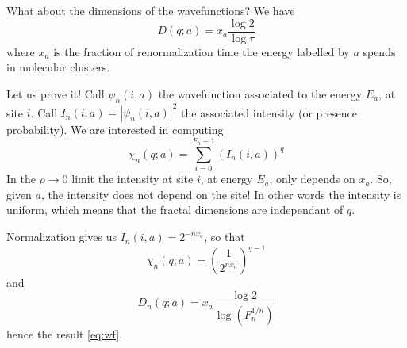 \documentclass[11pt]{article}
\begin{document}
What about the dimensions of the wavefunctions?
We have
\begin{equation}
\label{eq:wf}
	D(q;a) = x_a \frac{\log 2}{\log \tau}
\end{equation}
where $x_a$ is the fraction of renormalization time the energy labelled by $a$ spends in molecular clusters.

Let us prove it!
Call $\psi_n(i,a)$ the wavefunction associated to the energy $E_a$, at site $i$. Call $I_n(i,a) = |\psi_n(i,a)|^2$ the associated intensity (or presence probability).
We are interested in computing
\begin{equation}
	\chi_n(q;a) = \sum_{i=0}^{F_n - 1} (I_n(i,a))^q
\end{equation}
In the $\rho \rightarrow 0$ limit the intensity at site $i$, at energy $E_a$, only depends on $x_a$. So, given $a$, the intensity does not depend on the site! In other words the intensity is uniform, which means that the fractal dimensions are independant of $q$.

Normalization gives us $I_n(i,a) = 2^{-nx_a}$, so that
\begin{equation}
	\chi_n(q;a) = \left( \frac{1}{2^{n x_a}} \right)^{q-1}
\end{equation}
and
\begin{equation}
	D_n(q;a) = x_a \frac{\log 2}{\log( F_n^{1/n} )}
\end{equation}
hence the result \eqref{eq:wf}.

{}

\end{document}
